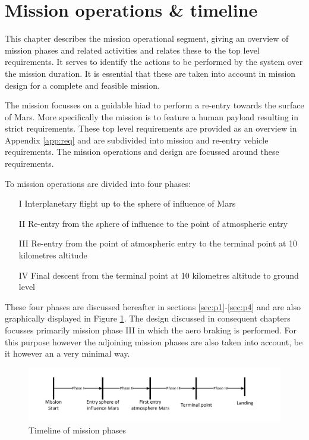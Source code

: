 \section{Mission operations \& timeline}\label{cha:opseg}
This chapter describes the mission operational segment, giving an overview of mission phases and related activities and relates these to the top level requirements. It serves to identify the actions to be performed by the system over the mission duration. It is essential that these are taken into account in mission design for a complete and feasible mission. 

The mission focusses on a guidable \acrfull{hiad} to perform a re-entry towards the surface of Mars. More specifically the mission is to feature a human payload resulting in strict requirements. These top level requirements are provided as an overview in Appendix \ref{app:req} and are subdivided into mission and re-entry vehicle requirements. The mission operations and design are focussed around these requirements.

To mission operations are divided into four phases: 

\begin{itemize}
\item[I]{Interplanetary flight up to the sphere of influence of Mars}
\item[II]{Re-entry from the sphere of influence to the point of atmospheric entry}
\item[III]{Re-entry from the point of atmospheric entry to the terminal point at 10 kilometres altitude}
\item[IV]{Final descent from the terminal point at 10 kilometres altitude to ground level}
\end{itemize}

These four phases are discussed hereafter in sections \ref{sec:p1}-\ref{sec:p4} and are also graphically displayed in Figure  \ref{fig:time}. The design discussed in consequent chapters focusses primarily mission phase III in which the aero braking is performed. For this purpose however the adjoining mission phases are also taken into account, be it however an a very minimal way. 

\begin{figure}[H]
\centering
\includegraphics[width = 1.0\textwidth]{Figure/OPS.pdf}
\caption{Timeline of mission phases}
\label{fig:time}
\end{figure}


